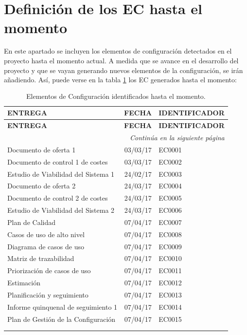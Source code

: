 \section{Definición de los EC hasta el momento}
\par En este apartado se incluyen los elementos de configuración detectados en el proyecto hasta el momento actual. A medida que se avance en el desarrollo del proyecto y que se vayan generando nuevos elementos de la configuración, se irán añadiendo. Así, puede verse en la tabla \ref{tab:ECactuales} los EC generados hasta el momento:

\begin{center}
\begin{longtable}{l c l}

\textbf{ENTREGA} & \textbf{FECHA} & \textbf{IDENTIFICADOR} \\\hline \hline
\endfirsthead
\textbf{ENTREGA} & \textbf{FECHA} & \textbf{IDENTIFICADOR} \\\hline \hline
\endhead

\hline \multicolumn{3}{r}{\textit{Continúa en la siguiente página}} \\
\endfoot
\endlastfoot

\label{EC:0001}Documento de oferta 1 & 03/03/17 & EC0001\\
\label{EC:0002}Documento de control 1 de costes & 03/03/17 & EC0002\\
\label{EC:0003}Estudio de Viabilidad del Sistema 1 & 24/02/17 & EC0003\\
\label{EC:0004}Documento de oferta 2 & 24/03/17 & EC0004\\
\label{EC:0005}Documento de control 2 de costes & 24/03/17 & EC0005\\
\label{EC:0006}Estudio de Viabilidad del Sistema 2 & 24/03/17 & EC0006\\
\label{EC:0007}Plan de Calidad & 07/04/17 & EC0007\\
\label{EC:0008}Casos de uso de alto nivel & 07/04/17 & EC0008\\
\label{EC:0009}Diagrama de casos de uso & 07/04/17 & EC0009\\
\label{EC:0010}Matriz de trazabilidad & 07/04/17 & EC0010\\
\label{EC:0011}Priorización de casos de uso & 07/04/17 & EC0011\\
\label{EC:0012}Estimación & 07/04/17 & EC0012\\
\label{EC:0013}Planificación y seguimiento & 07/04/17 & EC0013\\
\label{EC:0014}Informe quinquenal de seguimiento 1 & 07/04/17 & EC0014\\
\label{EC:0015}Plan de Gestión de la Configuración & 07/04/17 & EC0015\\\hline

\caption{Elementos de Configuración identificados hasta el momento.}\\
\label{tab:ECactuales}
\end{longtable}
\end{center}


